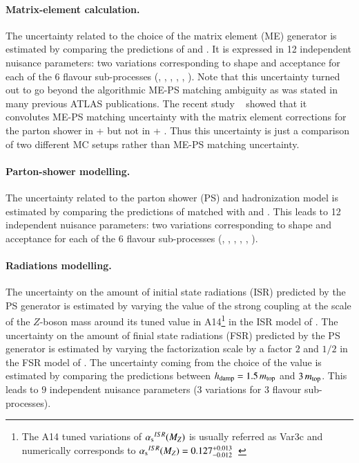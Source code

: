 \paragraph{Matrix-element calculation.} The uncertainty related to the choice of the matrix element (ME) generator is estimated by comparing the predictions of \powhegs and \mgamc. It is expressed in 12 independent nuisance parameters: two variations corresponding to shape and acceptance for each of the 6 flavour sub-processes (\ttl, \ttcin, \ttbb, \ttB, \ttb, \ttbbb). Note that this uncertainty turned out to go beyond the algorithmic ME-PS matching ambiguity as was stated in many previous ATLAS publications. The recent study ~\cite{ATL-PHYS-PUB-2020-023} showed that it convolutes ME-PS matching uncertainty with the matrix element corrections for the parton shower in \powhegs + \pythiaeight but not in \mgamc + \pythiaeight. Thus this uncertainty is just a comparison of two different MC setups rather than ME-PS matching uncertainty.

\paragraph{Parton-shower modelling.} The uncertainty related to the parton shower (PS) and hadronization model is  estimated by comparing the predictions of \powhegs matched with \pythiaeight and \herwigseven. This leads to 12 independent nuisance parameters: two variations corresponding to shape and acceptance for each of the 6 flavour sub-processes (\ttl, \ttcin, \ttbb, \ttB, \ttb, \ttbbb).

\paragraph{Radiations modelling.} The uncertainty on the amount of initial state radiations (ISR) predicted by the PS generator is estimated by varying the value of the strong coupling \alphas{} at the scale of the $Z$-boson mass around its tuned value in A14\footnote{The A14 tuned variations of ${\alpha_{\text{s}}}^{ISR}(M_Z)$ is usually referred as Var3c and numerically corresponds to ${\alpha_{\text{s}}}^{ISR}(M_Z)=0.127^{+0.013}_{-0.012}$~\cite{ATL-PHYS-PUB-2014-021}} in the ISR model of \pythiaeight. The uncertainty on the amount of finial state radiations (FSR) predicted by the PS generator is estimated by varying the factorization scale by a factor $2$ and $1/2$ in the FSR model of \pythiaeight. The uncertainty coming from the choice of the \hdamp{} value is estimated by comparing the predictions between $h_{\mathrm{damp}}=1.5\,m_{\mathrm{top}}$ and $3\,m_{\mathrm{top}}$. This leads to $9$ independent nuisance parameters ($3$ variations for $3$ flavour sub-processes).

